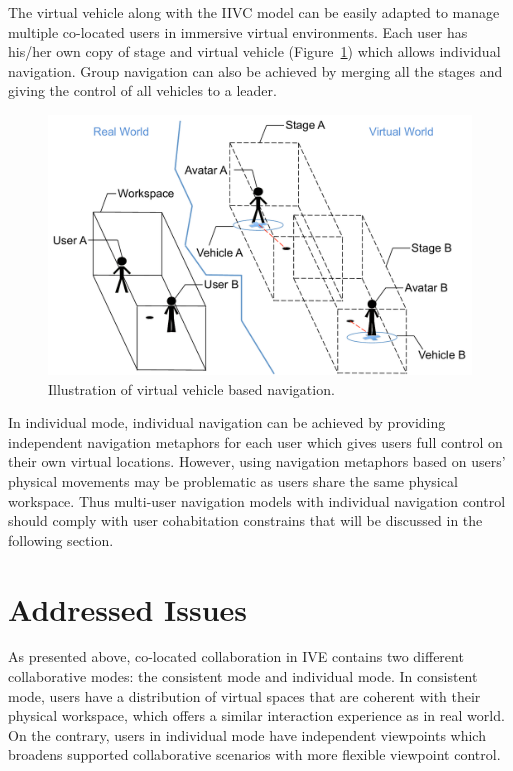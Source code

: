 The virtual vehicle along with the IIVC model can be easily adapted to manage multiple co-located users in immersive virtual environments. Each user has his/her own copy of stage and virtual vehicle (Figure~\ref{fig:2_multi_vehicle}) which allows individual navigation. Group navigation can also be achieved by merging all the stages and giving the control of all vehicles to a leader. 

\begin{figure}[htb]
  \centering
  \includegraphics[width=.8\textwidth]{figures/ch2/multi_vehicle}
  \caption{\label{fig:2_multi_vehicle}Illustration of virtual vehicle based navigation.}
\end{figure}

In individual mode, individual navigation can be achieved by providing independent navigation metaphors for each user which gives users full control on their own virtual locations. However, using navigation metaphors based on users' physical movements may be problematic as users share the same physical workspace. Thus multi-user navigation models with individual navigation control should comply with user cohabitation constrains that will be discussed in the following section.



\section{Addressed Issues}
As presented above, co-located collaboration in IVE contains two different collaborative modes: the consistent mode and individual mode. In consistent mode, users have a distribution of virtual spaces that are coherent with their physical workspace, which offers a similar interaction experience as in real world. On the contrary, users in individual mode have independent viewpoints which broadens supported collaborative scenarios with more flexible viewpoint control.

